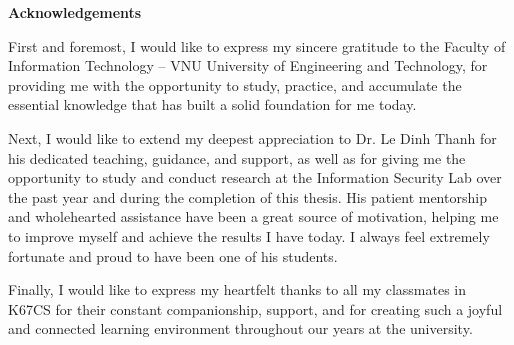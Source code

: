 \begin{center}
\textbf{\large{Acknowledgements}}
\end{center}

First and foremost, I would like to express my sincere gratitude to the Faculty of Information Technology -- VNU University of Engineering and Technology, for providing me with the opportunity to study, practice, and accumulate the essential knowledge that has built a solid foundation for me today.

Next, I would like to extend my deepest appreciation to Dr. Le Dinh Thanh for his dedicated teaching, guidance, and support, as well as for giving me the opportunity to study and conduct research at the Information Security Lab over the past year and during the completion of this thesis. His patient mentorship and wholehearted assistance have been a great source of motivation, helping me to improve myself and achieve the results I have today. I always feel extremely fortunate and proud to have been one of his students.

Finally, I would like to express my heartfelt thanks to all my classmates in K67CS for their constant companionship, support, and for creating such a joyful and connected learning environment throughout our years at the university.
